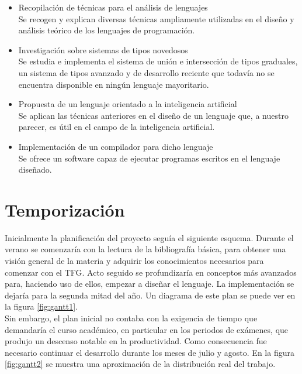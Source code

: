 \begin{itemize}
	\item Recopilación de técnicas para el análisis de lenguajes\\
	
	Se recogen y explican diversas técnicas ampliamente utilizadas en el diseño y análisis teórico de los lenguajes de programación.\\
	
	\item Investigación sobre sistemas de tipos novedosos\\
	
	Se estudia e implementa el sistema de unión e intersección de tipos graduales, un sistema de tipos avanzado y de desarrollo reciente que todavía no se encuentra disponible en ningún lenguaje mayoritario.\\
	
	\item Propuesta de un lenguaje orientado a la inteligencia artificial\\
	
	Se aplican las técnicas anteriores en el diseño de un lenguaje que, a nuestro parecer, es útil en el campo de la inteligencia artificial.\\
	
	\item Implementación de un compilador para dicho lenguaje\\
	
	Se ofrece un software capaz de ejecutar programas escritos en el lenguaje diseñado.\\
\end{itemize}


\section{Temporización}

Inicialmente la planificación del proyecto seguía el siguiente esquema. Durante el verano se comenzaría con la lectura de la bibliografía básica, para obtener una visión general de la materia y adquirir los conocimientos necesarios para comenzar con el TFG. Acto seguido se profundizaría en conceptos más avanzados para, haciendo uso de ellos, empezar a diseñar el lenguaje. La implementación se dejaría para la segunda mitad del año. Un diagrama de este plan se puede ver en la figura \ref{fig:gantt1}.\\

Sin embargo, el plan inicial no contaba con la exigencia de tiempo que demandaría el curso académico, en particular en los periodos de exámenes, que produjo un descenso notable en la productividad. Como consecuencia fue necesario continuar el desarrollo durante los meses de julio y agosto. En la figura \ref{fig:gantt2} se muestra una aproximación de la distribución real del trabajo.\\


